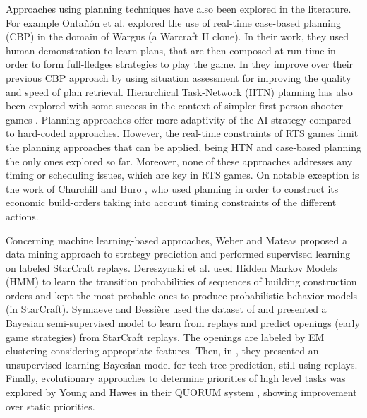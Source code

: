\documentclass[journal]{IEEEtran}
\begin{document}
Approaches using planning techniques have also been explored in the literature. For example Onta\~{n}\'{o}n et al. \cite{CBR_Planning} explored the use of real-time case-based planning (CBP) in the domain of Wargus (a Warcraft II clone). In their work, they used human demonstration to learn plans, that are then composed at run-time in order to form full-fledges strategies to play the game. In \cite{PlanRetrieval} they improve over  their previous CBP approach by using situation assessment for improving the quality and speed of plan retrieval. Hierarchical Task-Network (HTN) planning has also been explored with some success in the context of simpler first-person shooter games \cite{HTNPlanning}. Planning approaches offer more adaptivity of the AI strategy compared to hard-coded approaches. However, the real-time constraints of RTS games limit the planning approaches that can be applied, being HTN and case-based planning the only ones explored so far. Moreover, none of these approaches addresses any timing or scheduling issues, which are key in RTS games. On notable exception is the work of Churchill and Buro \cite{churchill2011build}, who used planning in order to construct its economic build-orders taking into account timing constraints of the different actions.

Concerning machine learning-based approaches, Weber and Mateas \cite{WeberCig09} proposed a data mining approach to strategy prediction and performed supervised learning on labeled StarCraft replays. Dereszynski et al. \cite{HMMstrat_RTS_AIIDE11} used Hidden Markov Models (HMM) to learn the transition probabilities of sequences of building construction orders and kept the most probable ones to produce probabilistic behavior models (in StarCraft). Synnaeve and Bessi\`{e}re \cite{SynnaeveOpeningCig11} used the dataset of \cite{WeberCig09} and presented a Bayesian semi-supervised model to learn from replays and predict openings (early game strategies) from StarCraft replays. The openings are labeled by EM clustering considering appropriate features. Then, in \cite{SynnaeveAIIDE11}, they presented an unsupervised learning Bayesian model for tech-tree prediction, still using replays. %
Finally, evolutionary approaches to determine priorities of high level tasks was explored by Young and Hawes in their QUORUM system \cite{young2012evolutionary}, showing improvement over static priorities.
\end{document}

